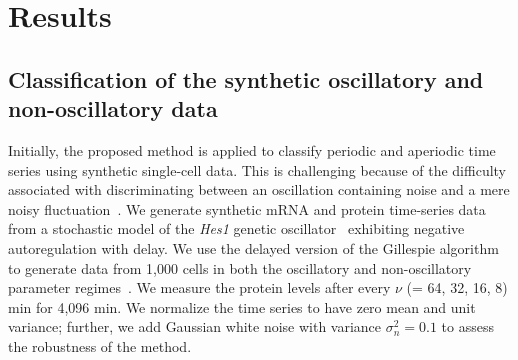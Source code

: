 \documentclass[twocolumn,pre,amsmath,amssymb]{revtex4-1}
\begin{document}
\section{Results}
\subsection{Classification of the synthetic oscillatory and non-oscillatory data}
Initially, the proposed method is applied 
to classify periodic and aperiodic time series using synthetic single-cell data. 
This is challenging because of the difficulty associated with discriminating 
between an oscillation containing noise and a mere noisy fluctuation~\cite{phillips:hesplos:2017}.
We generate synthetic mRNA and protein time-series data from a stochastic model of the \textit{Hes1} genetic 
oscillator~\cite{monk:hesmodel:2003, galla:fluctuation:2009} exhibiting 
negative autoregulation with delay. We use the delayed version of the Gillespie  
algorithm~\cite{gillespie:exact:1977, anderson:gillespie:2007} 
to generate data from 1,000 cells in both the oscillatory and non-oscillatory parameter regimes~\cite{galla:fluctuation:2009, brett:distributed:2013}. 
We measure the protein levels after every $\nu$ (= 64, 32, 16, 8) min for 4,096 min. 
We normalize the time series to have zero mean and unit variance;
further, we add Gaussian white noise with variance $\sigma^2_n=0.1$ to assess the robustness of the method.
\end{document}
